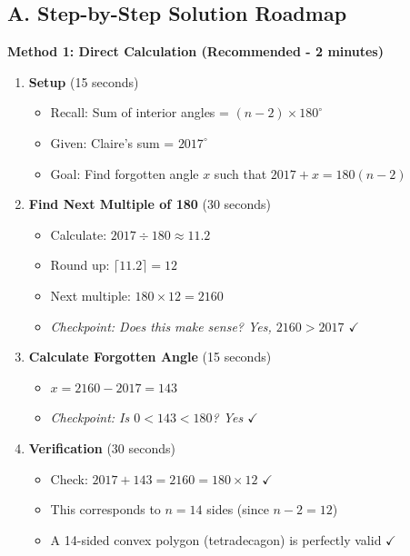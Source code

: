 \documentclass[]{article}
\begin{document}
\begin{solutionbox}
\subsection*{A. Step-by-Step Solution Roadmap}

\textbf{Method 1: Direct Calculation (Recommended - 2 minutes)}

\begin{enumerate}[leftmargin=*]
    \item \textbf{Setup} (15 seconds)
    \begin{itemize}
        \item Recall: Sum of interior angles = $(n-2) \times 180^\circ$
        \item Given: Claire's sum = $2017^\circ$
        \item Goal: Find forgotten angle $x$ such that $2017 + x = 180(n-2)$
    \end{itemize}
    
    \item \textbf{Find Next Multiple of 180} (30 seconds)
    \begin{itemize}
        \item Calculate: $2017 \div 180 \approx 11.2$
        \item Round up: $\lceil 11.2 \rceil = 12$
        \item Next multiple: $180 \times 12 = 2160$
        \item \textit{Checkpoint: Does this make sense? Yes, $2160 > 2017$ $\checkmark$}
    \end{itemize}
    
    \item \textbf{Calculate Forgotten Angle} (15 seconds)
    \begin{itemize}
        \item $x = 2160 - 2017 = 143$
        \item \textit{Checkpoint: Is $0 < 143 < 180$? Yes $\checkmark$}
    \end{itemize}
    
    \item \textbf{Verification} (30 seconds)
    \begin{itemize}
        \item Check: $2017 + 143 = 2160 = 180 \times 12$ $\checkmark$
        \item This corresponds to $n = 14$ sides (since $n - 2 = 12$)
        \item A 14-sided convex polygon (tetradecagon) is perfectly valid $\checkmark$
    \end{itemize}
    

\end{enumerate}
\end{solutionbox}
\end{document}
